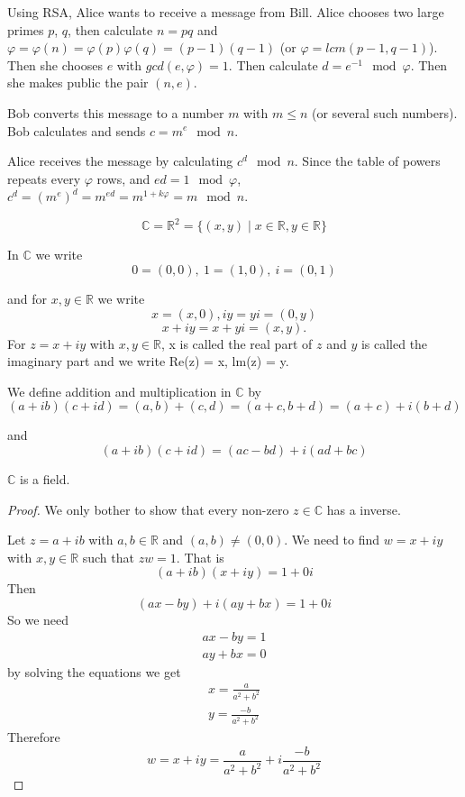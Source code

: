 
\begin{exmp}
    Using RSA, Alice wants to receive a message from Bill. Alice chooses two large primes $p$, $q$, then calculate $n = pq$ and $\varphi = \varphi (n) = \varphi (p) \varphi (q) = (p-1)(q-1)$ (or $\varphi = lcm(p-1, q-1)$). Then she chooses $e$ with $gcd(e,\varphi) = 1$. Then calculate $d = e^{-1} \mod \varphi$. Then she makes public the pair $(n,e)$.
    
    Bob converts this message to a number $m$ with $m\leq n$ (or several such numbers). Bob calculates and sends $c = m^e \mod n$.
    
    Alice receives the message by calculating $c^d \mod n$. Since the table of powers repeats every $\varphi$ rows, and $ed = 1 \mod \varphi$, $c^d = {(m^e)}^d = m^{ed} = m^{1+k\varphi} = m \mod n$.
\end{exmp}



\[\mathbb{C} = \mathbb{R}^2 = \{(x,y) \mid x \in \mathbb{R}, y \in \mathbb{R} \}\]

In $\mathbb{C}$ we write \[0 = (0,0) , \ 1 = (1,0) , \ i = (0,1)\]

and for $x, y \in \mathbb{R}$ we write \[x = (x,0), iy = yi = (0, y)\]
\[x + iy = x+yi = (x,y).\]
For $z = x+ iy$ with $x, y \in \mathbb{R}$, x is called the real part of $z$ and $y$ is called the imaginary part and we write Re(z) = x, lm(z) = y.

We define addition and multiplication in $\mathbb{C}$ by
\[(a+ib)(c+id) = (a,b) + (c,d) = (a+c, b+d) = (a+c) + i(b+d)\]

and 
\[(a+ib)(c+id) = (ac-bd) + i(ad+bc) \]

\begin{thm}
$\mathbb{C}$ is a field.
\end{thm}

\begin{proof}
We only bother to show that every non-zero $z\in\mathbb{C}$ has a inverse.

Let $z = a + ib$ with $a,b\in\mathbb{R}$ and $(a,b)\neq (0,0)$. We need to find $w = x + iy$ with $x,y\in\mathbb{R}$ such that $zw = 1$.
That is \[(a+ib)(x+iy)= 1+0i\]
Then \[(ax-by)+i(ay+bx) = 1+0i\]
So we need \begin{gather*}
    ax-by = 1\\
    ay+bx = 0
\end{gather*}
by solving the equations we get \begin{gather*}
    x = \frac{a}{a^2+b^2}\\
    y = \frac{-b}{a^2+b^2}
\end{gather*}
Therefore \[w = x+iy = \frac{a}{a^2+b^2} + i\frac{-b}{a^2+b^2}\]
\end{proof}

